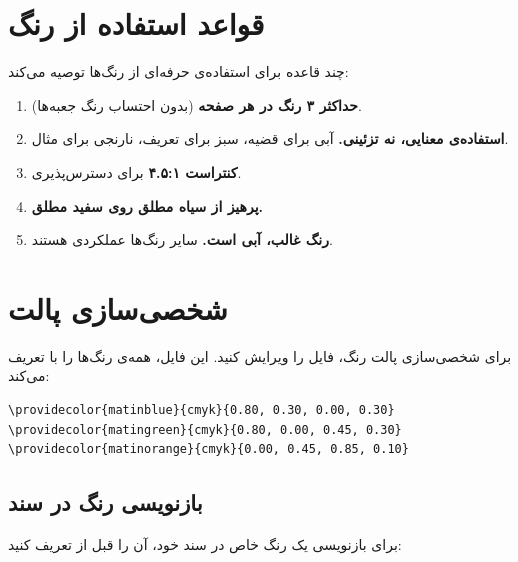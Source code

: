 \section{قواعد استفاده از رنگ}
\label{sec:colors-rules}

 چند قاعده برای استفاده‌ی
حرفه‌ای از رنگ‌ها توصیه می‌کند:

\begin{enumerate}
    \item \textbf{حداکثر ۳ رنگ در هر صفحه}
    (بدون احتساب رنگ جعبه‌ها).
    \item \textbf{استفاده‌ی معنایی، نه تزئینی.}
    آبی برای قضیه، سبز برای تعریف، نارنجی
    برای مثال.
    \item \textbf{کنتراست ۴.۵:۱} برای
    دسترس‌پذیری.
    \item \textbf{پرهیز از سیاه مطلق روی
    سفید مطلق.}
    \item \textbf{رنگ غالب، آبی است.} سایر
    رنگ‌ها عملکردی هستند.
\end{enumerate}


\section{شخصی‌سازی پالت}
\label{sec:colors-customization}

برای شخصی‌سازی پالت رنگ، فایل
 را ویرایش کنید.
این فایل، همه‌ی رنگ‌ها را با
 تعریف می‌کند:

\begin{latin}
\begin{verbatim}
\providecolor{matinblue}{cmyk}{0.80, 0.30, 0.00, 0.30}
\providecolor{matingreen}{cmyk}{0.80, 0.00, 0.45, 0.30}
\providecolor{matinorange}{cmyk}{0.00, 0.45, 0.85, 0.10}
\end{verbatim}
\end{latin}


\subsection{بازنویسی رنگ در سند}
\label{sec:colors-override}

برای بازنویسی یک رنگ خاص در سند خود، آن
را قبل از  تعریف کنید:

